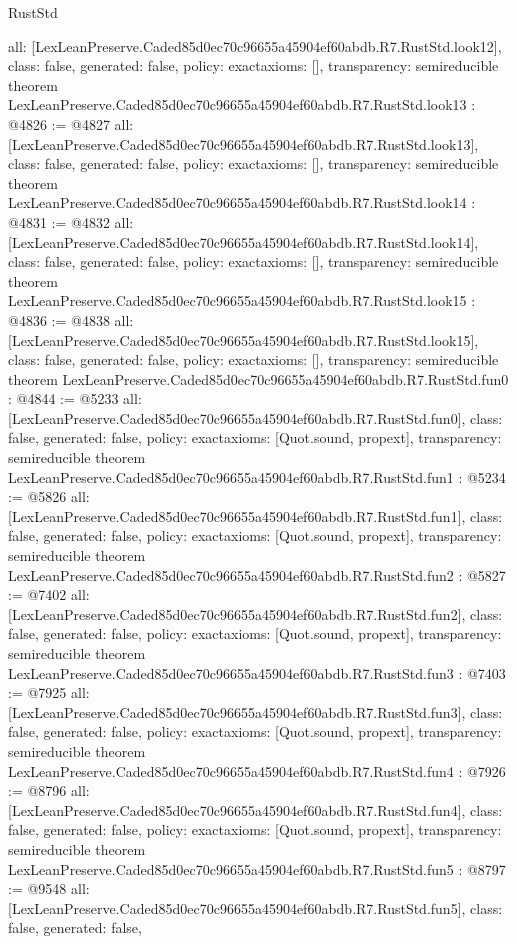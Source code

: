 \begin{lexlean}{RustStd}
\begin{coremodule}
{  all: [LexLeanPreserve.Caded85d0ec70c96655a45904ef60abdb.R7.RustStd.look12],
  class: false,
  generated: false,
  policy: exact{axioms: []},
  transparency: semireducible
}
theorem LexLeanPreserve.Caded85d0ec70c96655a45904ef60abdb.R7.RustStd.look13 : @4826 := @4827 {
  all: [LexLeanPreserve.Caded85d0ec70c96655a45904ef60abdb.R7.RustStd.look13],
  class: false,
  generated: false,
  policy: exact{axioms: []},
  transparency: semireducible
}
theorem LexLeanPreserve.Caded85d0ec70c96655a45904ef60abdb.R7.RustStd.look14 : @4831 := @4832 {
  all: [LexLeanPreserve.Caded85d0ec70c96655a45904ef60abdb.R7.RustStd.look14],
  class: false,
  generated: false,
  policy: exact{axioms: []},
  transparency: semireducible
}
theorem LexLeanPreserve.Caded85d0ec70c96655a45904ef60abdb.R7.RustStd.look15 : @4836 := @4838 {
  all: [LexLeanPreserve.Caded85d0ec70c96655a45904ef60abdb.R7.RustStd.look15],
  class: false,
  generated: false,
  policy: exact{axioms: []},
  transparency: semireducible
}
theorem LexLeanPreserve.Caded85d0ec70c96655a45904ef60abdb.R7.RustStd.fun0 : @4844 := @5233 {
  all: [LexLeanPreserve.Caded85d0ec70c96655a45904ef60abdb.R7.RustStd.fun0],
  class: false,
  generated: false,
  policy: exact{axioms: [Quot.sound, propext]},
  transparency: semireducible
}
theorem LexLeanPreserve.Caded85d0ec70c96655a45904ef60abdb.R7.RustStd.fun1 : @5234 := @5826 {
  all: [LexLeanPreserve.Caded85d0ec70c96655a45904ef60abdb.R7.RustStd.fun1],
  class: false,
  generated: false,
  policy: exact{axioms: [Quot.sound, propext]},
  transparency: semireducible
}
theorem LexLeanPreserve.Caded85d0ec70c96655a45904ef60abdb.R7.RustStd.fun2 : @5827 := @7402 {
  all: [LexLeanPreserve.Caded85d0ec70c96655a45904ef60abdb.R7.RustStd.fun2],
  class: false,
  generated: false,
  policy: exact{axioms: [Quot.sound, propext]},
  transparency: semireducible
}
theorem LexLeanPreserve.Caded85d0ec70c96655a45904ef60abdb.R7.RustStd.fun3 : @7403 := @7925 {
  all: [LexLeanPreserve.Caded85d0ec70c96655a45904ef60abdb.R7.RustStd.fun3],
  class: false,
  generated: false,
  policy: exact{axioms: [Quot.sound, propext]},
  transparency: semireducible
}
theorem LexLeanPreserve.Caded85d0ec70c96655a45904ef60abdb.R7.RustStd.fun4 : @7926 := @8796 {
  all: [LexLeanPreserve.Caded85d0ec70c96655a45904ef60abdb.R7.RustStd.fun4],
  class: false,
  generated: false,
  policy: exact{axioms: [Quot.sound, propext]},
  transparency: semireducible
}
theorem LexLeanPreserve.Caded85d0ec70c96655a45904ef60abdb.R7.RustStd.fun5 : @8797 := @9548 {
  all: [LexLeanPreserve.Caded85d0ec70c96655a45904ef60abdb.R7.RustStd.fun5],
  class: false,
  generated: false,
}
\end{coremodule}
\end{lexlean}
